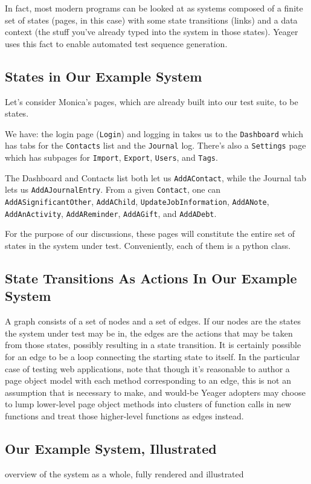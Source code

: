 In fact, most modern programs can be looked at as systems composed of a finite set of states (pages, in this case) with some state transitions (links) and a data context (the stuff you've already typed into the system in those states). Yeager uses this fact to enable automated test sequence generation.

\subsection{States in Our Example System}
Let's consider Monica's pages, which are already built into our test suite, to be states.

We have: the login page (\texttt{Login}) and logging in takes us to the \texttt{Dashboard} which has tabs for the \texttt{Contacts} list and the \texttt{Journal} log. There's also a \texttt{Settings} page which has subpages for \texttt{Import}, \texttt{Export}, \texttt{Users}, and \texttt{Tags}.

The Dashboard and Contacts list both let us \texttt{AddAContact}, while the Journal tab lets us \texttt{AddAJournalEntry}. From a given \texttt{Contact}, one can \texttt{AddASignificantOther}, \texttt{AddAChild}, \texttt{UpdateJobInformation}, \texttt{AddANote}, \texttt{AddAnActivity}, \texttt{AddAReminder}, \texttt{AddAGift}, and \texttt{AddADebt}.

For the purpose of our discussions, these pages will constitute the entire set of states in the system under test. Conveniently, each of them is a python class.

\subsection{State Transitions As Actions In Our Example System}
A graph consists of a set of nodes and a set of edges. If our nodes are the states the system under test may be in, the edges are the actions that may be taken from those states, possibly resulting in a state transition. It is certainly possible for an edge to be a loop connecting the starting state to itself. In the particular case of testing web applications, note that though it's reasonable to author a page object model with each method corresponding to an edge, this is not an assumption that is necessary to make, and would-be Yeager adopters may choose to lump lower-level page object methods into clusters of function calls in new functions and treat those higher-level functions as edges instead.

\subsection{Our Example System, Illustrated}
overview of the system as a whole, fully rendered and illustrated %

